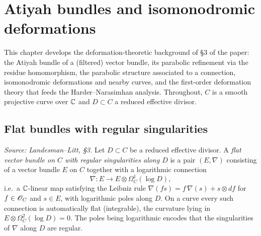 \chapter{Atiyah bundles and isomonodromic deformations}
\label{chap:deformation}


\providecommand{\on}{\operatorname}
\providecommand{\sheafend}{\mathscr{E}\kern -1pt nd}

This chapter develops the deformation-theoretic background of \S3 of the paper:
the Atiyah bundle of a (filtered) vector bundle, its parabolic refinement via the
residue homomorphism, the parabolic structure associated to a connection,
isomonodromic deformations and nearby curves, and the first-order deformation
theory that feeds the Harder--Narasimhan analysis. Throughout, $C$ is a smooth
projective curve over $\mathbb{C}$ and $D \subset C$ a reduced effective divisor.

\section{Flat bundles with regular singularities}
\label{sec:deformation-flat-bundle}

\begin{definition}
  \label{def:flat-bundle}
  \textit{Source: Landesman--Litt, \S3.}
  Let $D \subset C$ be a reduced effective divisor. A \emph{flat vector bundle on
  $C$ with regular singularities along $D$} is a pair $(E,\nabla)$ consisting of a
  vector bundle $E$ on $C$ together with a logarithmic connection
  \[
    \nabla: E \to E \otimes \Omega^1_C(\log D),
  \]
  i.e.\ a $\mathbb{C}$-linear map satisfying the Leibniz rule
  $\nabla(fs) = f\,\nabla(s) + s \otimes df$ for $f \in \mathscr{O}_C$ and $s \in E$,
  with logarithmic poles along $D$. On a curve every such connection is
  automatically flat (integrable), the curvature lying in
  $E \otimes \Omega^2_C(\log D) = 0$. The poles being logarithmic encodes that
  the singularities of $\nabla$ along $D$ are regular.
\end{definition}

